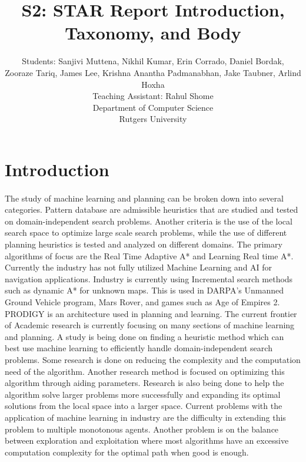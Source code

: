 \documentclass[tog]{acmsiggraph}
\title{S2: STAR Report Introduction, Taxonomy, and Body}
\author{Students: %
 Sanjivi Muttena\emailfoot{sm1727@scarletmail.rutgers.edu}, %
 Nikhil Kumar\emailfoot{nikhilkumar516@gmail.com}, %
 Erin Corrado\emailfoot{e.corrado144@gmail.com}, %
 Daniel Bordak\emailfoot{dbordak@fastmail.fm},%
 \\Zooraze Tariq\emailfoot{zooraze@gmail.com}, %
 James Lee\emailfoot{yl50@scarletmail.rutgers.edu}, %
 Krishna Anantha Padmanabhan\emailfoot{krishna.ananth@rutgers.edu}, %
 Jake Taubner\emailfoot{jdt97@scarletmail.rutgers.edu}, %
 Arlind Hoxha\emailfoot{ah621@scarletmail.rutgers.edu}%
 \\Teaching Assistant: Rahul Shome\emailfoot{rahulshome.in@gmail.com}%
 \\Department of Computer Science%
 \\Rutgers University}
\begin{document}
\maketitle


\begin{abstract}

\paragraph{}



\end{abstract}


\keywordlist


\section{Introduction}

\paragraph{}
	The study of machine learning and planning can be broken down into several categories. Pattern database are admissible heuristics that are studied and tested on domain-independent search problems. Another criteria is the use of the local search space to optimize large scale search problems, while the use of different planning heuristics is tested and analyzed on different domains. The primary algorithms of focus are the Real Time Adaptive A* and Learning Real time A*. Currently the industry has not fully utilized Machine Learning and AI for navigation applications. Industry is currently using Incremental search methods such as dynamic A* for unknown maps. This is used in DARPA’s Unmanned Ground Vehicle program, Mars Rover, and games such as Age of Empires 2. PRODIGY is an architecture used in planning and learning. The current frontier of Academic research is currently focusing on many sections of machine learning and planning. A study is being done on finding a heuristic method which can best use machine learning to efficiently handle domain-independent search problems. Some research is done on reducing the complexity and the computation need of the algorithm. Another research method is focused on optimizing this algorithm through aiding parameters. Research is also being done to help the algorithm solve larger problems more successfully and expanding its optimal solutions from the local space into a larger space. Current problems with the application of machine learning in industry are the difficulty in extending this problem to multiple monotonous agents. Another problem is on the balance between exploration and exploitation where most algorithms have an excessive computation complexity for the optimal path when good is enough.
\end{document}
